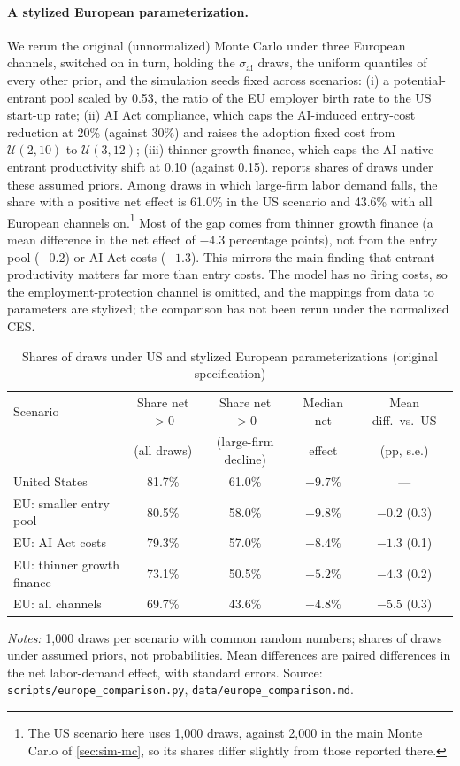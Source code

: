 \paragraph{A stylized European parameterization.}
We rerun the original (unnormalized) Monte Carlo under three European channels, switched on in turn, holding the $\sigma_{\text{ai}}$ draws, the uniform quantiles of every other prior, and the simulation seeds fixed across scenarios:
(i) a potential-entrant pool scaled by 0.53, the ratio of the EU employer birth rate to the US start-up rate;
(ii) AI Act compliance, which caps the AI-induced entry-cost reduction at 20\% (against 30\%) and raises the adoption fixed cost from $\mathcal{U}(2,10)$ to $\mathcal{U}(3,12)$;
(iii) thinner growth finance, which caps the AI-native entrant productivity shift at 0.10 (against 0.15).
 reports shares of draws under these assumed priors.
Among draws in which large-firm labor demand falls, the share with a positive net effect is 61.0\% in the US scenario and 43.6\% with all European channels on.\footnote{The US scenario here uses 1,000 draws, against 2,000 in the main Monte Carlo of \cref{sec:sim-mc}, so its shares differ slightly from those reported there.}
Most of the gap comes from thinner growth finance (a mean difference in the net effect of $-4.3$ percentage points), not from the entry pool ($-0.2$) or AI Act costs ($-1.3$).
This mirrors the main finding that entrant productivity matters far more than entry costs.
The model has no firing costs, so the employment-protection channel is omitted, and the mappings from data to parameters are stylized; the comparison has not been rerun under the normalized CES.

\begin{table}[h]
  \centering
  \caption{Shares of draws under US and stylized European parameterizations (original specification)}
  \label{tab:eu-mc}
  \small
  \begin{tabular}{lcccc}
    \toprule
    Scenario & Share net $>0$ & Share net $>0$ & Median net & Mean diff.\ vs.\ US \\
    & (all draws) & (large-firm decline) & effect & (pp, s.e.) \\
    \midrule
    United States & 81.7\% & 61.0\% & $+9.7\%$ & --- \\
    EU: smaller entry pool & 80.5\% & 58.0\% & $+9.8\%$ & $-0.2$ (0.3) \\
    EU: AI Act costs & 79.3\% & 57.0\% & $+8.4\%$ & $-1.3$ (0.1) \\
    EU: thinner growth finance & 73.1\% & 50.5\% & $+5.2\%$ & $-4.3$ (0.2) \\
    EU: all channels & 69.7\% & 43.6\% & $+4.8\%$ & $-5.5$ (0.3) \\
    \bottomrule
  \end{tabular}
  \par\smallskip
  \parbox{\linewidth}{\footnotesize\raggedright\textit{Notes:} 1,000 draws per scenario with common random numbers; shares of draws under assumed priors, not probabilities. Mean differences are paired differences in the net labor-demand effect, with standard errors. Source: \texttt{scripts/europe\_comparison.py}, \texttt{data/europe\_comparison.md}.}
\end{table}
